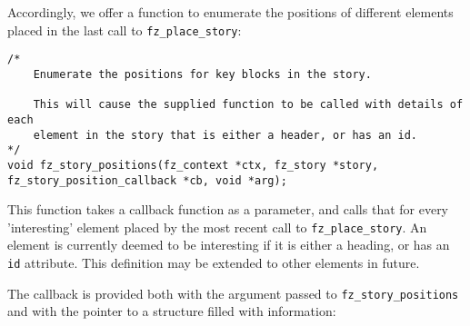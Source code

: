 \documentclass[oneside]{book}
\begin{document}
Accordingly, we offer a function to enumerate the positions of different elements placed in the last call to \texttt{fz\_place\_story}:

\begin{lstlisting}
/*
	Enumerate the positions for key blocks in the story.

	This will cause the supplied function to be called with details of each
	element in the story that is either a header, or has an id.
*/
void fz_story_positions(fz_context *ctx, fz_story *story, fz_story_position_callback *cb, void *arg);
\end{lstlisting}

This function takes a callback function as a parameter, and calls that for every 'interesting' element placed by the most recent call to \texttt{fz\_place\_story}. An element is currently deemed to be interesting if it is either a heading, or has an \texttt{id} attribute. This definition may be extended to other elements in future.

The callback is provided both with the argument passed to \texttt{fz\_story\_positions} and with the pointer to a structure filled with information:
\end{document}
